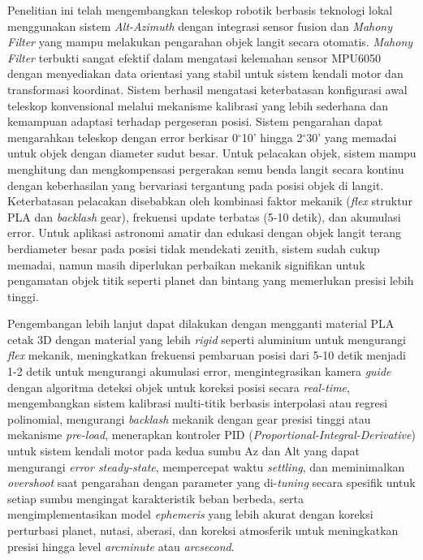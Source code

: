 \begin{center}
	Penelitian ini telah mengembangkan teleskop robotik berbasis teknologi lokal menggunakan sistem \textit{Alt-Azimuth} dengan integrasi sensor fusion dan \textit{Mahony Filter} yang mampu melakukan pengarahan objek langit secara otomatis. \textit{Mahony Filter} terbukti sangat efektif dalam mengatasi kelemahan sensor MPU6050 dengan menyediakan data orientasi yang stabil untuk sistem kendali motor dan transformasi koordinat. Sistem berhasil mengatasi keterbatasan konfigurasi awal teleskop konvensional melalui mekanisme kalibrasi yang lebih sederhana dan kemampuan adaptasi terhadap pergeseran posisi. Sistem pengarahan dapat mengarahkan teleskop dengan error berkisar 0$^{\circ}$10' hingga 2$^{\circ}$30' yang memadai untuk objek dengan diameter sudut besar. Untuk pelacakan objek, sistem mampu menghitung dan mengkompensasi pergerakan semu benda langit secara kontinu dengan keberhasilan yang bervariasi tergantung pada posisi objek di langit. Keterbatasan pelacakan disebabkan oleh kombinasi faktor mekanik (\textit{flex} struktur PLA dan \textit{backlash} gear), frekuensi update terbatas (5-10 detik), dan akumulasi error. Untuk aplikasi astronomi amatir dan edukasi dengan objek langit terang berdiameter besar pada posisi tidak mendekati zenith, sistem sudah cukup memadai, namun masih diperlukan perbaikan mekanik signifikan untuk pengamatan objek titik seperti planet dan bintang yang memerlukan presisi lebih tinggi.\par
	
	Pengembangan lebih lanjut dapat dilakukan dengan mengganti material PLA cetak 3D dengan material yang lebih \textit{rigid} seperti aluminium untuk mengurangi \textit{flex} mekanik, meningkatkan frekuensi pembaruan posisi dari 5-10 detik menjadi 1-2 detik untuk mengurangi akumulasi error, mengintegrasikan kamera \textit{guide} dengan algoritma deteksi objek untuk koreksi posisi secara \textit{real-time}, mengembangkan sistem kalibrasi multi-titik berbasis interpolasi atau regresi polinomial, mengurangi \textit{backlash} mekanik dengan gear presisi tinggi atau mekanisme \textit{pre-load}, menerapkan kontroler PID (\textit{Proportional-Integral-Derivative}) untuk sistem kendali motor pada kedua sumbu Az dan Alt yang dapat mengurangi \textit{error steady-state}, mempercepat waktu \textit{settling}, dan meminimalkan \textit{overshoot} saat pengarahan dengan parameter yang di-\textit{tuning} secara spesifik untuk setiap sumbu mengingat karakteristik beban berbeda, serta mengimplementasikan model \textit{ephemeris} yang lebih akurat dengan koreksi perturbasi planet, nutasi, aberasi, dan koreksi atmosferik untuk meningkatkan presisi hingga level \textit{arcminute} atau \textit{arcsecond}.\par

	\vfill
	
\end{center}
\clearpage